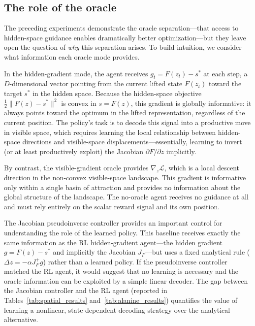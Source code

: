 \documentclass[10pt]{article}
\theoremstyle{definition}
\begin{document}
\subsection{The role of the oracle}

The preceding experiments demonstrate the oracle separation---that access to hidden-space guidance enables dramatically better optimization---but they leave open the question of \emph{why} this separation arises. To build intuition, we consider what information each oracle mode provides.

In the hidden-gradient mode, the agent receives $g_t = F(z_t) - s^*$ at each step, a $D$-dimensional vector pointing from the current lifted state $F(z_t)$ toward the target $s^*$ in the hidden space. Because the hidden-space objective $\frac{1}{2}\|F(z) - s^*\|^2$ is convex in $s = F(z)$, this gradient is globally informative: it always points toward the optimum in the lifted representation, regardless of the current position. The policy's task is to decode this signal into a productive move in visible space, which requires learning the local relationship between hidden-space directions and visible-space displacements---essentially, learning to invert (or at least productively exploit) the Jacobian $\partial F / \partial z$ implicitly.

By contrast, the visible-gradient oracle provides $\nabla_z \mathcal{L}$, which is a local descent direction in the non-convex visible-space landscape. This gradient is informative only within a single basin of attraction and provides no information about the global structure of the landscape. The no-oracle agent receives no guidance at all and must rely entirely on the scalar reward signal and its own position.

The Jacobian pseudoinverse controller provides an important control for understanding the role of the learned policy. This baseline receives exactly the same information as the RL hidden-gradient agent---the hidden gradient $g = F(z) - s^*$ and implicitly the Jacobian $J_F$---but uses a fixed analytical rule ($\Delta z = -\alpha J_F^+ g$) rather than a learned policy. If the pseudoinverse controller matched the RL agent, it would suggest that no learning is necessary and the oracle information can be exploited by a simple linear decoder. The gap between the Jacobian controller and the RL agent (reported in Tables~\ref{tab:spatial_results} and~\ref{tab:alanine_results}) quantifies the value of learning a nonlinear, state-dependent decoding strategy over the analytical alternative.
\end{document}
